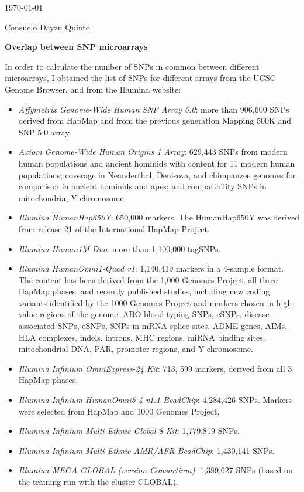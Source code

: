 \documentclass[11pt]{report}
\begin{document}
\today

Consuelo Dayzu Quinto

\begin{center}
\textbf{Overlap between SNP microarrays}
\end{center}

In order to calculate the number of SNPs in common between different microarrays, I obtained the list of SNPs for different arrays from the UCSC Genome Browser, and from the Illumina website:

\begin{itemize}
\item \textit{Affymetrix Genome-Wide Human SNP Array 6.0}: more than 906,600 SNPs derived from  HapMap and from the previous generation Mapping 500K and SNP 5.0  array. 
\item \textit{Axiom Genome-Wide Human Origins 1 Array}: 629,443 SNPs from modern human populations and ancient hominids with content for 11 modern human populations; coverage in Neanderthal, Denisova, and chimpanzee
genomes for comparison in ancient hominids and apes; and compatibility SNPs in mitochondria, Y chromosome. 
\item \textit{Illumina HumanHap650Y}: 650,000 markers. The HumanHap650Y was derived from release 21 of the International HapMap Project.
\item \textit{Illumina Human1M-Duo}: more than 1,100,000 tagSNPs.
\item \textit{Illumina HumanOmni1-Quad v1}: 1,140,419 markers in a 4-sample format. The content has been derived from the 1,000 Genomes Project, all three HapMap phases, and recently published studies, including new coding variants identified by the 1000 Genomes Project and markers chosen in high-value regions of the genome: ABO blood typing SNPs, cSNPs, disease-associated SNPs, eSNPs, SNPs in mRNA splice sites, ADME genes, AIMs, HLA complexes, indels, introns, MHC regions, miRNA binding sites, mitochondrial DNA, PAR, promoter regions, and Y-chromosome.
\item \textit{Illumina Infinium OmniExpress-24 Kit}: 713, 599 markers, derived from all 3 HapMap phases. 
\item \textit{Illumina Infinium HumanOmni5-4 v1.1 BeadChip}: 4,284,426 SNPs. Markers were selected from HapMap and 1000 Genomes Project.
\item \textit{Illumina Infinium Multi-Ethnic Global-8 Kit}: 1,779,819 SNPs. 
\item \textit{Illumina Infinium Multi-Ethnic AMR/AFR BeadChip}: 1,430,141 SNPs. 
\item \textit{Illumina MEGA GLOBAL (version Consortium)}: 1,389,627 SNPs (based on the training run with the cluster GLOBAL). 
\end{itemize}
\end{document}
